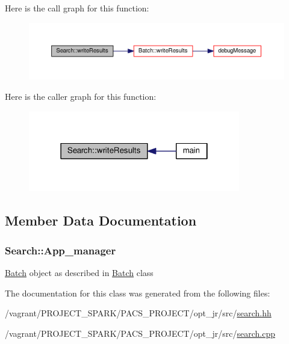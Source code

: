 Here is the call graph for this function\-:
\nopagebreak
\begin{figure}[H]
\begin{center}
\leavevmode
\includegraphics[width=350pt]{classSearch_a5fd3baeb685f1ab699743b9a1d2fc4d6_cgraph}
\end{center}
\end{figure}




Here is the caller graph for this function\-:
\nopagebreak
\begin{figure}[H]
\begin{center}
\leavevmode
\includegraphics[width=262pt]{classSearch_a5fd3baeb685f1ab699743b9a1d2fc4d6_icgraph}
\end{center}
\end{figure}




\subsection{Member Data Documentation}
\hypertarget{classSearch_aa5f2a65e5b640dec221284069963b91a}{
\subsubsection[{App\-\_\-manager}]{ Search\-::\-App\-\_\-manager\hspace{0.3cm}{\ttfamily [private]}}}\label{classSearch_aa5f2a65e5b640dec221284069963b91a}
\hyperlink{classBatch}{Batch} object as described in \hyperlink{classBatch}{Batch} class 

The documentation for this class was generated from the following files\-:\begin{DoxyCompactItemize}
\item 
/vagrant/\-P\-R\-O\-J\-E\-C\-T\-\_\-\-S\-P\-A\-R\-K/\-P\-A\-C\-S\-\_\-\-P\-R\-O\-J\-E\-C\-T/opt\-\_\-jr/src/\hyperlink{search_8hh}{search.\-hh}\item 
/vagrant/\-P\-R\-O\-J\-E\-C\-T\-\_\-\-S\-P\-A\-R\-K/\-P\-A\-C\-S\-\_\-\-P\-R\-O\-J\-E\-C\-T/opt\-\_\-jr/src/\hyperlink{search_8cpp}{search.\-cpp}\end{DoxyCompactItemize}
